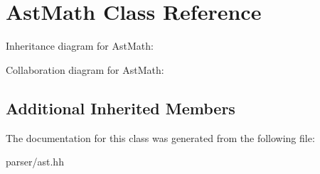 \hypertarget{classAstMath}{}\section{Ast\+Math Class Reference}
\label{classAstMath}


Inheritance diagram for Ast\+Math\+:


Collaboration diagram for Ast\+Math\+:
\subsection*{Additional Inherited Members}


The documentation for this class was generated from the following file\+:\begin{DoxyCompactItemize}
\item 
parser/ast.\+hh\end{DoxyCompactItemize}
